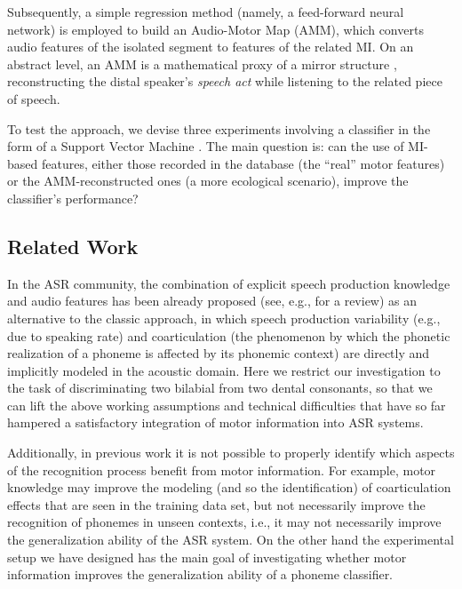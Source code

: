 Subsequently, a simple regression method (namely, a feed-forward neural network) is employed
to build an Audio-Motor Map (AMM), which converts audio features of the isolated segment to
features of the related MI. On an abstract level, an AMM is a mathematical proxy of a mirror
structure \cite{umilta-01}, reconstructing the distal speaker's \emph{speech act} while
listening to the related piece of speech.

To test the approach, we devise three experiments involving a classifier in the form of a
Support Vector Machine \cite{BGV92}. The main question is: can the use of MI-based features,
either those recorded in the database (the ``real'' motor features) or the AMM-reconstructed
ones (a more ecological scenario), improve the classifier's performance?

\subsection{Related Work}

In the ASR community, the combination of explicit speech production knowledge and audio
features has been already proposed (see, e.g., \cite{king} for a review) as an alternative to the
classic approach, in which speech production variability (e.g., due to speaking rate) and
coarticulation (the phenomenon by which the phonetic realization of a phoneme is affected
by its phonemic context) are directly and implicitly modeled in the acoustic domain.
Here we restrict our investigation to the task of discriminating two bilabial from two
dental consonants, so that we can lift the above working assumptions and technical
difficulties that have so far hampered a satisfactory integration of motor information
into ASR systems.

Additionally, in previous work it is not possible to properly identify which aspects of the
recognition process benefit from motor information. For example, motor knowledge may improve
the modeling (and so the identification) of coarticulation effects that are seen in the training
data set, but not necessarily improve the recognition of phonemes in unseen contexts, i.e., it
may not necessarily improve the generalization ability of the ASR system. On the other hand the
experimental setup we have designed has the main goal of investigating whether motor information
improves the generalization ability of a phoneme classifier.


